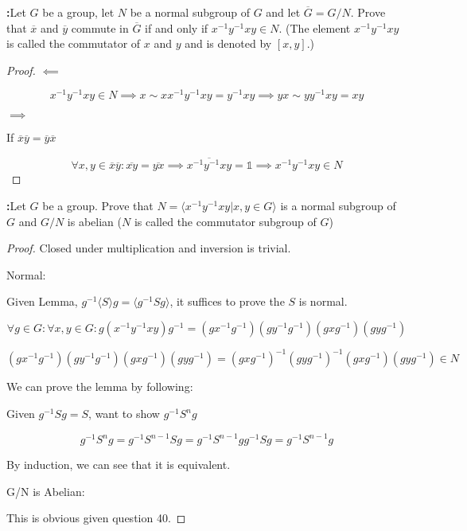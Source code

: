 \documentclass[11pt]{article}
\newcommand{\one}{\mathds{1}}
\newenvironment{exercise}[1]
	{\noindent \textbf{#1:}}
	{\par \vspace{0.5\baselineskip}}
\begin{document}
\begin{exercise}{40}
	\textsf{Let \(G\) be a group, let \(N\) be a normal subgroup of \(G\) and let \(\overline{G} = G/N\). Prove that \(\overline{x}\) and \(\overline{y}\) commute in \(\overline{G}\) if and only if \(x^{-1}y^{-1}xy \in N\). (The element \(x^{-1}y^{-1}xy\) is called the commutator of \(x\) and \(y\) and is denoted by \([x, y]\).)}
\end{exercise}{}

\begin{proof}
	$\impliedby$

	\[
		x^{-1}y^{-1}xy \in N \implies x \sim x x^{-1} y^{-1}xy = y^{-1}xy \implies yx \sim yy^{-1}xy = xy
	\]

	$\implies$

	If $\overline{x}\overline{y}=\overline{y}\overline{x}$

	\[
		\forall x,y \in \overline{x}\overline{y} : \overline{xy}=\overline{yx} \implies \overline{x^{-1}y^{-1}xy}=\one \implies x^{-1}y^{-1}xy \in N
	\]
\end{proof}

\begin{exercise}{41}
	\textsf{Let \(G\) be a group. Prove that \(N = \langle x^{-1}y^{-1} xy | x, y \in G \rangle\) is a normal subgroup of \(G\) and \(G / N\) is abelian (\(N\) is called the commutator subgroup of \(G\))}
\end{exercise}{}

\begin{proof}
	Closed under multiplication and inversion is trivial.

	Normal:

	Given Lemma, \(g^{-1}\langle S \rangle g = \langle g^{-1} S g \rangle\), it suffices to prove the \(S\) is normal.

	\[
		\forall g \in G: \forall x,y \in G: g(x^{-1}y^{-1}xy)g^{-1} = (gx^{-1}g^{-1})(gy^{-1}g^{-1})(gxg^{-1})(gyg^{-1})
	\]

	\[
		(gx^{-1}g^{-1})(gy^{-1}g^{-1})(gxg^{-1})(gyg^{-1}) = (gxg^{-1})^{-1}(gyg^{-1})^{-1}(gxg^{-1})(gyg^{-1}) \in N
	\]

	We can prove the lemma by following:

	Given \(g^{-1}Sg=S\), want to show \(g^{-1}S^ng\)

	\[
		g^{-1}S^ng = g^{-1}S^{n-1}Sg=g^{-1}S^{n-1}gg^{-1}Sg=g^{-1}S^{n-1}g
	\]

	By induction, we can see that it is equivalent.

	G/N is Abelian:

	This is obvious given question 40.
\end{proof}
\end{document}
